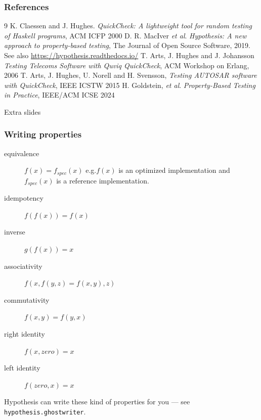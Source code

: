 \documentclass{beamer}
\begin{document}
\begin{frame}
  \frametitle{References}

  \begin{thebibliography}{9}
   K. Claessen and J. Hughes.
    \emph{QuickCheck: A lightweight tool for random testing of Haskell
      programs}, ACM ICFP 2000
   D. R. MacIver \emph{et al}.
    \emph{Hypothesis: A new approach to property-based testing},
    The Journal of Open Source Software, 2019.
    See also \url{https://hypothesis.readthedocs.io/}
   T. Arts, J. Hughes and J. Johansson
    \emph{Testing Telecoms Software with Quviq QuickCheck},
    ACM Workshop on Erlang, 2006
   T. Arts, J. Hughes, U. Norell and H. Svensson,
    \emph{Testing AUTOSAR software with QuickCheck}, IEEE ICSTW 2015
   H. Goldstein, \emph{et al}. \emph{Property-Based
      Testing in Practice}, IEEE/ACM ICSE 2024
  \end{thebibliography}


\end{frame}

\begin{frame}
\begin{center}
  \Huge Extra slides
\end{center} 
\end{frame}


\begin{frame}
  \frametitle{Writing properties}

  \begin{description}
  \item[equivalence] $f(x) = f_{spec} (x)$
  e.g.\@ $f(x)$ is an optimized implementation
  and $f_{spec}(x)$ is a reference implementation.
    
  \item[idempotency] $f(f(x)) = f(x)$
  \item[inverse]  $g(f(x)) = x$ 
  \item[associativity] $f(x,f(y,z) = f(x,y),z)$
  \item[commutativity] $f(x,y) = f(y,x)$
  \item[right identity] $f(x,zero) = x$
  \item[left identity] $f(zero,x)= x$
  \end{description}
  \bigskip

  Hypothesis can write these kind of properties for you ---
  see \texttt{hypothesis.ghostwriter}.

\end{frame}
\end{document}
